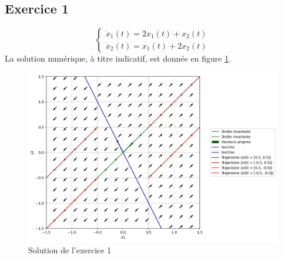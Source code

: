         \subsection{Exercice 1}
            \begin{equation*}
                \begin{cases}
                    \dot{x}_1(t) = 2 x_1(t) + x_2(t)\\
                    \dot{x}_2(t) = x_1(t) + 2 x_2(t)
                \end{cases}
            \end{equation*}
            La solution numérique, à titre indicatif, est donnée en figure \ref{fig:conclusif_1}.
            \begin{figure}[ht!]
                \centering
                \includegraphics[width=\textwidth]{images/conclusif_1.jpg}
                \caption{Solution de l'exercice 1}
                \label{fig:conclusif_1}
            \end{figure}
